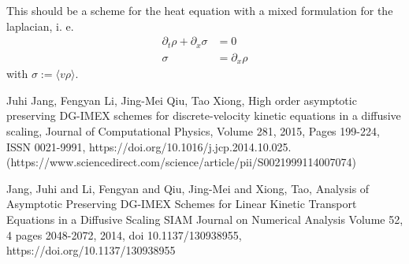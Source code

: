 \documentclass[]{article}
\begin{document}
This should be a scheme for the heat equation with a mixed formulation for the laplacian, i. e.
\begin{align*}
\partial_t \rho + \partial_x \sigma & = 0 \\
\sigma & = \partial_x \rho
\end{align*}
with $\sigma := \langle v \rho \rangle$.



\begin{thebibliography}{9}
	Juhi Jang, Fengyan Li, Jing-Mei Qiu, Tao Xiong,
	High order asymptotic preserving DG-IMEX schemes for discrete-velocity kinetic equations in a diffusive scaling,
	Journal of Computational Physics,
	Volume 281,
	2015,
	Pages 199-224,
	ISSN 0021-9991,
	https://doi.org/10.1016/j.jcp.2014.10.025.
	(https://www.sciencedirect.com/science/article/pii/S0021999114007074)
	
		Jang, Juhi and Li, Fengyan and Qiu, Jing-Mei and Xiong, Tao,
		Analysis of Asymptotic Preserving DG-IMEX Schemes for Linear Kinetic Transport Equations in a Diffusive Scaling
		SIAM Journal on Numerical Analysis
		Volume 52, 4
		pages 2048-2072,
		2014,
		doi 10.1137/130938955,
			https://doi.org/10.1137/130938955


\end{thebibliography}
\end{document}

